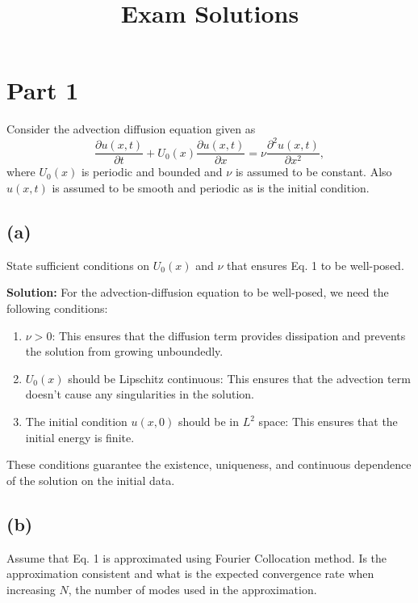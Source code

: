 \documentclass{article}
\title{Exam Solutions}
\author{}
\date{}
\begin{document}

\maketitle

\section*{Part 1}
Consider the advection diffusion equation given as
\begin{equation}
    \frac{\partial u(x, t)}{\partial t} + U_0(x) \frac{\partial u(x, t)}{\partial x} = \nu \frac{\partial^2 u(x, t)}{\partial x^2},
\end{equation}
where $U_0(x)$ is periodic and bounded and $\nu$ is assumed to be constant. Also $u(x, t)$ is assumed to be smooth and periodic as is the initial condition.

\subsection*{(a)}
State sufficient conditions on $U_0(x)$ and $\nu$ that ensures Eq. 1 to be well-posed.

\textbf{Solution:}
For the advection-diffusion equation to be well-posed, we need the following conditions:
\begin{enumerate}
    \item $\nu > 0$: This ensures that the diffusion term provides dissipation and prevents the solution from growing unboundedly.
    \item $U_0(x)$ should be Lipschitz continuous: This ensures that the advection term doesn't cause any singularities in the solution.
    \item The initial condition $u(x,0)$ should be in $L^2$ space: This ensures that the initial energy is finite.
\end{enumerate}
These conditions guarantee the existence, uniqueness, and continuous dependence of the solution on the initial data.

\subsection*{(b)}
Assume that Eq. 1 is approximated using Fourier Collocation method. Is the approximation consistent and what is the expected convergence rate when increasing $N$, the number of modes used in the approximation.
\end{document}
